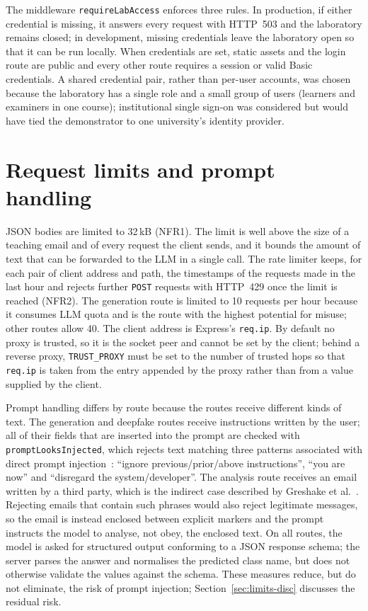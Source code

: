 The middleware \texttt{requireLabAccess} enforces three rules. In production, if either credential is missing, it answers every request with HTTP~503 and the laboratory remains closed; in development, missing credentials leave the laboratory open so that it can be run locally. When credentials are set, static assets and the login route are public and every other  route requires a session or valid Basic credentials. A shared credential pair, rather than per-user accounts, was chosen because the laboratory has a single role and a small group of users (learners and examiners in one course); institutional single sign-on was considered but would have tied the demonstrator to one university's identity provider.

\section{Request limits and prompt handling}
\label{sec:limits}

JSON bodies are limited to 32\,kB (NFR1). The limit is well above the size of a teaching email and of every request the client sends, and it bounds the amount of text that can be forwarded to the LLM in a single call. The rate limiter keeps, for each pair of client address and path, the timestamps of the requests made in the last hour and rejects further \texttt{POST} requests with HTTP~429 once the limit is reached (NFR2). The generation route is limited to 10 requests per hour because it consumes LLM quota and is the route with the highest potential for misuse; other routes allow 40. The client address is Express's \texttt{req.ip}. By default no proxy is trusted, so it is the socket peer and cannot be set by the client; behind a reverse proxy, \texttt{TRUST\_PROXY} must be set to the number of trusted hops so that \texttt{req.ip} is taken from the entry appended by the proxy rather than from a value supplied by the client.

Prompt handling differs by route because the routes receive different kinds of text. The generation and deepfake routes receive instructions written by the user; all of their fields that are inserted into the prompt are checked with \texttt{promptLooksInjected}, which rejects text matching three patterns associated with direct prompt injection~\cite{perez2022ignore}: ``ignore previous/prior/above instructions'', ``you are now'' and ``disregard the system/developer''. The analysis route receives an email written by a third party, which is the indirect case described by Greshake et al.~\cite{greshake2023signed}. Rejecting emails that contain such phrases would also reject legitimate messages, so the email is instead enclosed between explicit markers and the prompt instructs the model to analyse, not obey, the enclosed text. On all routes, the model is asked for structured output conforming to a JSON response schema; the server parses the answer and normalises the predicted class name, but does not otherwise validate the values against the schema. These measures reduce, but do not eliminate, the risk of prompt injection; Section~\ref{sec:limits-disc} discusses the residual risk.

